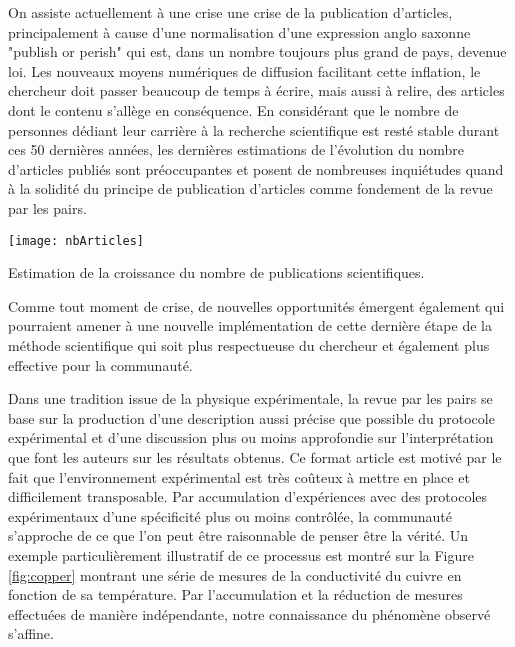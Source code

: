 On assiste actuellement à une \og crise \fg une crise de la publication d'articles, principalement à cause d'une normalisation d'une expression anglo saxonne "publish or perish" qui est, dans un nombre toujours plus grand de pays, devenue loi. Les nouveaux moyens numériques de diffusion facilitant cette inflation, le chercheur doit passer beaucoup de temps à écrire, mais aussi à relire, des articles dont le contenu s'allège en conséquence. En considérant que le nombre de personnes dédiant leur carrière à la recherche scientifique est resté stable durant ces 50 dernières années, les dernières estimations de l'évolution du nombre d'articles publiés sont préoccupantes\cite{bornmann2015growth} et posent de nombreuses inquiétudes quand à la solidité du principe de publication d'articles comme fondement de la revue par les pairs.

\begin{marginfigure}
  \texttt{[image: nbArticles]}
  \caption{Estimation de la croissance du nombre de publications scientifiques.}
\end{marginfigure}


Comme tout moment de crise, de nouvelles opportunités émergent également qui pourraient amener à une nouvelle implémentation de cette dernière étape de la méthode scientifique qui soit plus respectueuse du chercheur et également plus effective pour la communauté. 

Dans une tradition issue de la physique expérimentale, la revue par les pairs se base sur la production d'une description aussi précise que possible du protocole expérimental et d'une discussion plus ou moins approfondie sur l'interprétation que font les auteurs sur les résultats obtenus. Ce format \og article \fg est motivé par le fait que l'environnement expérimental est très coûteux à mettre en place et difficilement transposable. Par accumulation d'expériences avec des protocoles expérimentaux d'une spécificité plus ou moins contrôlée, la communauté s'approche de ce que l'on peut être raisonnable de penser être la vérité. Un exemple particulièrement illustratif de ce processus est montré sur la Figure \ref{fig:copper} montrant une série de mesures de la conductivité du cuivre en fonction de sa température. Par l'accumulation et la réduction de mesures effectuées de manière indépendante, notre connaissance du phénomène observé s'affine.

